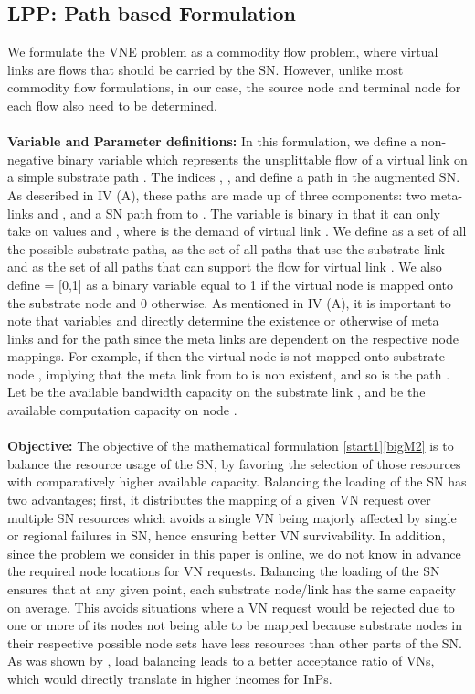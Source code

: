 \documentclass[journal]{IEEEtran}
\begin{document}
\subsection{\textbf{LPP}: Path based Formulation }
We formulate the \ac{VNE} problem as a commodity flow problem\cite{Pfetsch06}, where virtual links are flows that should be carried by the \ac{SN}. However, unlike most commodity flow formulations, in our case, the source node  and terminal node  for each flow also need to be determined.\\\\
\textbf{Variable and Parameter definitions:} In this formulation, we define a non-negative binary variable  which represents the unsplittable flow of a virtual link  on a simple substrate path . The indices , ,  and  define a path  in the augmented \ac{SN}. As described in IV (A), these paths are made up of three components:  two meta-links  and , and a \ac{SN} path from  to . The variable  is binary in that it can only take on values  and , where  is the demand of virtual link . We define  as a set of all the possible substrate paths,  as the set of all paths that use the substrate link  and  as the set of all paths that can support the flow for virtual link . We also define  = [0,1] as a binary variable equal to 1 if the virtual node  is mapped onto the substrate node  and 0 otherwise. As mentioned in IV (A), it is important to note that variables  and  directly determine the existence or otherwise of meta links  and  for the path  since the meta links are dependent on the respective node mappings. For example, if  then the virtual node  is not mapped onto substrate node , implying that the meta link from  to  is non existent, and so is the path . Let  be the available bandwidth capacity on the substrate link , and  be the available computation capacity on node .\\\\
\textbf{Objective:} The objective of the mathematical formulation \eqref{start1}\eqref{bigM2} is to balance the resource usage of the \ac{SN}, by favoring the selection of those resources with comparatively higher available capacity. Balancing the loading of the \ac{SN} has two advantages; first, it distributes the mapping of a given VN request over multiple \ac{SN} resources which avoids a single VN being majorly affected by single or regional failures in \ac{SN}, hence ensuring better VN survivability. In addition, since the problem we consider in this paper is online, we do not know in advance the required node locations for VN requests. Balancing the loading of the \ac{SN} ensures that at any given point, each substrate node/link has the same capacity on average. This avoids situations where a VN request would be rejected due to one or more of its nodes not being able to be mapped because substrate nodes in their respective possible node sets  have less resources than other parts of the \ac{SN}. As was shown by \cite{Chowdhury12}, load balancing leads to a better acceptance ratio of \acp{VN}, which would directly translate in higher incomes for \acp{InP}.
\end{document}

